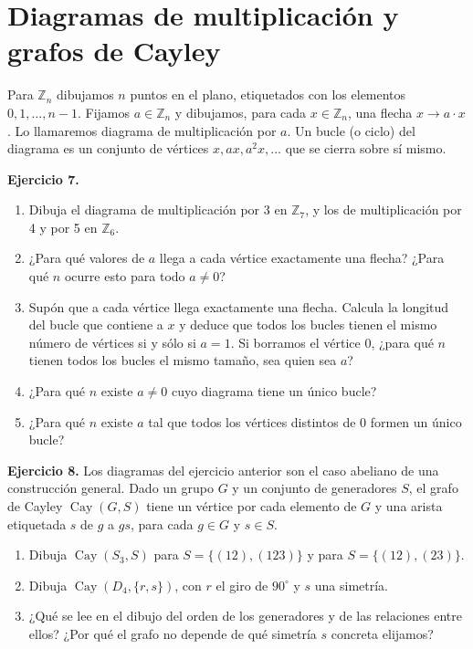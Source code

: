 \documentclass[11pt,a4paper]{article}
\newcommand{\Z}{\mathbb Z}
\newcommand{\ej}[1]{\par\medskip\textbf{Ejercicio #1.}\enspace}
\begin{document}
\section{Diagramas de multiplicación y grafos de Cayley}
Para $\Z_n$ dibujamos $n$ puntos en el plano, etiquetados con los elementos $0,1,\ldots,n-1$. Fijamos $a\in\Z_n$ y dibujamos, para cada $x\in\Z_n$, una flecha $x\to a\cdot x$. Lo llamaremos diagrama de multiplicación por $a$. Un bucle (o ciclo) del diagrama es un conjunto de vértices $x,ax,a^2x,\ldots$ que se cierra sobre sí mismo.
\ej{7}
\begin{enumerate}[label=(\alph*)]
\item Dibuja el diagrama de multiplicación por 3 en $\Z_7$, y los de multiplicación por 4 y por 5 en $\Z_6$.
\item ¿Para qué valores de $a$ llega a cada vértice exactamente una flecha? ¿Para qué $n$ ocurre esto para todo $a\neq0$?
\item Supón que a cada vértice llega exactamente una flecha. Calcula la longitud del bucle que contiene a $x$ y deduce que todos los bucles tienen el mismo número de vértices si y sólo si $a=1$. Si borramos el vértice 0, ¿para qué $n$ tienen todos los bucles el mismo tamaño, sea quien sea $a$?
\item ¿Para qué $n$ existe $a\neq0$ cuyo diagrama tiene un único bucle?
\item ¿Para qué $n$ existe $a$ tal que todos los vértices distintos de 0 formen un único bucle?
\end{enumerate}
\ej{8} Los diagramas del ejercicio anterior son el caso abeliano de una construcción general. Dado un grupo $G$ y un conjunto de generadores $S$, el grafo de Cayley $\operatorname{Cay}(G,S)$ tiene un vértice por cada elemento de $G$ y una arista etiquetada $s$ de $g$ a $gs$, para cada $g\in G$ y $s\in S$.
\begin{enumerate}[label=(\alph*)]
\item Dibuja $\operatorname{Cay}(S_3,S)$ para $S=\{(12),(123)\}$ y para $S=\{(12),(23)\}$.
\item Dibuja $\operatorname{Cay}(D_4,\{r,s\})$, con $r$ el giro de $90^\circ$ y $s$ una simetría.
\item ¿Qué se lee en el dibujo del orden de los generadores y de las relaciones entre ellos? ¿Por qué el grafo no depende de qué simetría $s$ concreta elijamos?
\end{enumerate}
\end{document}
